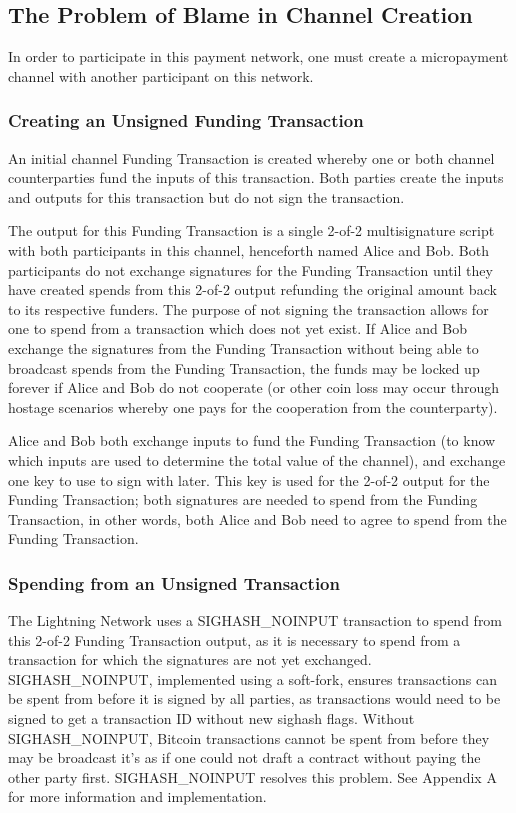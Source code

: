 \documentclass[letterpaper,11pt]{article}
\begin{document}
\subsection{The Problem of Blame in Channel Creation}

In order to participate in this payment network, one must create a micropayment
channel with another participant on this network. 

\subsubsection{Creating an Unsigned Funding Transaction}

An initial channel Funding Transaction is created whereby one or both channel
counterparties fund the inputs of this transaction. Both parties create the
inputs and outputs for this transaction but do not sign the transaction.

The output for this Funding Transaction is a single 2-of-2 multisignature script
with both participants in this channel, henceforth named Alice and Bob. Both
participants do not exchange signatures for the Funding Transaction until they
have created spends from this 2-of-2 output refunding the original amount back
to its respective funders. The purpose of not signing the transaction allows for
one to spend from a transaction which does not yet exist. If Alice and Bob
exchange the signatures from the Funding Transaction without being able to
broadcast spends from the Funding Transaction, the funds may be locked up
forever if Alice and Bob do not cooperate (or other coin loss may occur through
hostage scenarios whereby one pays for the cooperation from the counterparty).

Alice and Bob both exchange inputs to fund the Funding Transaction (to know
which inputs are used to determine the total value of the channel), and exchange
one key to use to sign with later. This key is used for the 2-of-2 output for
the Funding Transaction; both signatures are needed to spend from the Funding
Transaction, in other words, both Alice and Bob need to agree to spend from the
Funding Transaction.

\subsubsection{Spending from an Unsigned Transaction}

The Lightning Network uses a SIGHASH\_NOINPUT transaction to spend from this
2-of-2 Funding Transaction output, as it is necessary to spend from a
transaction for which the signatures are not yet exchanged. SIGHASH\_NOINPUT,
implemented using a soft-fork, ensures transactions can be spent from before it
is signed by all parties, as transactions would need to be signed to get a
transaction ID without new sighash flags. Without SIGHASH\_NOINPUT, Bitcoin
transactions cannot be spent from before they may be broadcast \textemdash it's
as if one could not draft a contract without paying the other party first.
SIGHASH\_NOINPUT resolves this problem. See Appendix A for more information and
implementation.
\end{document}
